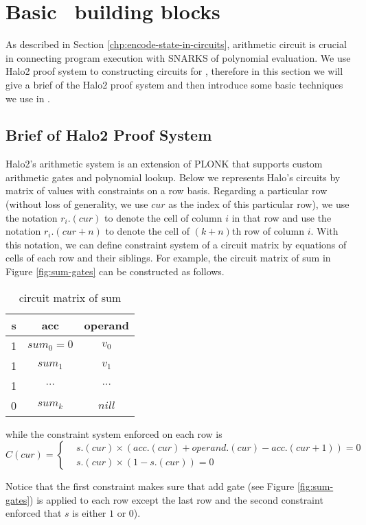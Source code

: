 \section{Basic \zkwasm\, building blocks}
As described in Section \ref{chp:encode-state-in-circuits}, arithmetic circuit is crucial in connecting program execution with SNARKS of polynomial evaluation. We use Halo2 proof system to constructing circuits for \zkwasm, therefore in this section we will give a brief of the Halo2 proof system and then introduce some basic techniques we use in \zkwasm.
\subsection{Brief of Halo2 Proof System}
\label{chp:constraint-system}
Halo2's arithmetic system is an extension of PLONK that supports custom arithmetic gates and polynomial lookup. Below we represents Halo's circuits by matrix of values with constraints on a row basis. Regarding a particular row (without loss of generality, we use $cur$ as the index of this particular row), we use the notation $r_i.(cur)$ to denote the cell of column $i$ in that row and use the notation $r_i.(cur + n)$ to denote the cell of $(k+n)$th row of column $i$. With this notation, we can define constraint system of a circuit matrix by equations of cells of each row and their siblings. For example, the circuit matrix of sum in Figure \ref{fig:sum-gates} can be constructed as follows.

\begin{table}[!h]
\begin{center}
\begin{tabular}{ | c | c | c |}
  \hline
  s & acc & operand \\ 
  \hline
 1 & $sum_0 = 0$ & $v_0$\\
 \hline
 1 & $sum_1$ & $v_1$\\
 \hline
 1 & $\cdots$ & $\cdots$\\
 \hline
 0 & $sum_k$ & $nill$\\
 \hline
\end{tabular}
\caption{circuit matrix of sum}
\label{tbl:sum-table}
\end{center}
\end{table}

\noindent while the constraint system enforced on each row is
\[
 C(cur) = \begin{cases}
     &s.(cur) \times (acc.(cur) + operand.(cur) - acc.(cur+1)) = 0 \\
     &s.(cur) \times (1-s.(cur)) = 0
 \end{cases}
\]
\begin{remark}
Notice that the first constraint makes sure that add gate (see Figure \ref{fig:sum-gates}) is applied to each row except the last row and the second constraint enforced that $s$ is either $1$ or $0$).
\end{remark}

